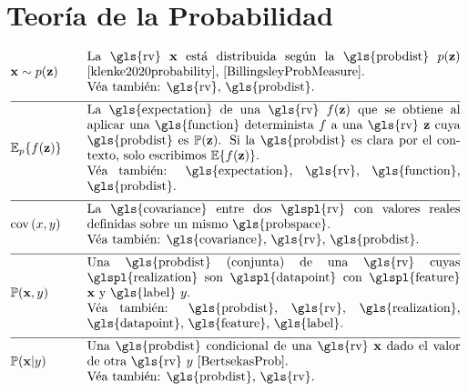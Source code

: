 \newpage
\section*{Teoría de la Probabilidad} 
\begin{align}
	&\featurevec \sim p(\vz)  &\quad & \parbox{.85\textwidth}{La \gls{rv} $\featurevec$ está distribuida según 
		la \gls{probdist} $p(\vz)$ \cite{klenke2020probability}, \cite{BillingsleyProbMeasure}.
		\\ Véa también: \gls{rv}, \gls{probdist}.} \nonumber \\[2mm] \hline \nonumber\\[-5mm]  
	&\expect_{p} \{ f(\datapoint) \}  &\quad & \parbox{.85\textwidth}{La \gls{expectation} de una \gls{rv} $f(\datapoint)$ que 
		se obtiene al aplicar una \gls{function} determinista $f$ a una \gls{rv}
		$\datapoint$ cuya \gls{probdist} es $\prob{\datapoint}$. Si la \gls{probdist} es clara por el contexto, 
		solo escribimos $\expect \{ f(\datapoint) \}$. 
		\\ Véa también: \gls{expectation}, \gls{rv}, \gls{function}, \gls{probdist}.} \nonumber \\[2mm] \hline \nonumber\\[-5mm]
	&\cov{x}{y} &\quad & \parbox{.85\textwidth}{La \gls{covariance} entre dos \glspl{rv} con valores reales definidas 
		sobre un mismo \gls{probspace}. 
		\\ Véa también: \gls{covariance}, \gls{rv}, \gls{probdist}.} \nonumber \\[2mm] \hline \nonumber\\[-5mm]
	&\prob{\featurevec,\truelabel} &\quad & \parbox{.85\textwidth}{Una \gls{probdist} (conjunta) de una \gls{rv} 
		cuyas \glspl{realization} son \glspl{datapoint} con \glspl{feature} $\featurevec$ y \gls{label} $\truelabel$.
		\\ Véa también: \gls{probdist}, \gls{rv}, \gls{realization}, \gls{datapoint}, \gls{feature}, 
		\gls{label}.} \nonumber \\[2mm] \hline \nonumber\\[-5mm]
	&\prob{\featurevec|\truelabel} &\quad & \parbox{.85\textwidth}{Una \gls{probdist} condicional de una \gls{rv} 
		$\featurevec$ dado el valor de otra \gls{rv} $\truelabel$ \cite[Sec.\ 3.5]{BertsekasProb}. 
		\\ Véa también: \gls{probdist}, \gls{rv}.} \nonumber 
\end{align} 






